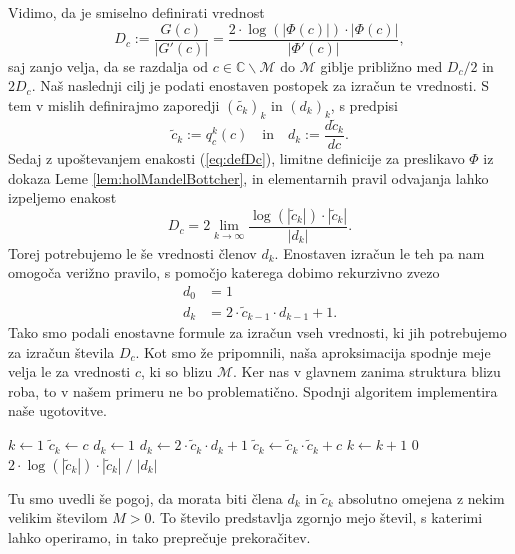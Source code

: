 \documentclass[12pt,a4paper]{amsart}
\theoremstyle{definition} %
\theoremstyle{plain} %
\newcommand{\CC}{\mathbb C}
\newcommand{\M}{\mathscr M} %
\newcommand{\algAnd}{\;\textbf{and}\;}
\begin{document}
Vidimo, da je smiselno definirati vrednost 
\begin{equation}\label{eq:defDc}
D_c := \frac{G(c)}{|G'(c)|} =  \frac{2 \cdot \log\left(|\Phi(c)|\right) \cdot |\Phi(c)|}{|\Phi'(c)|},
\end{equation}
saj zanjo velja, da se razdalja od $c \in \CC \smallsetminus \M$ do $\M$ giblje približno med $D_c/2$ in $2D_c$.
Naš naslednji cilj je podati enostaven postopek za izračun te vrednosti.
S tem v mislih definirajmo zaporedji $(\tilde{c_k})_k$ in $(d_k)_k$, s predpisi
$$\tilde{c}_k := q_c^k(c) \quad \text{in} \quad d_k := \frac{d\tilde{c}_k}{dc}.$$
Sedaj z upoštevanjem enakosti (\ref{eq:defDc}), limitne definicije za preslikavo $\Phi$ iz dokaza Leme \ref{lem:holMandelBottcher},
in elementarnih pravil odvajanja lahko izpeljemo enakost
$$
D_c = 2 \lim_{k\to\infty} \frac{\log(|\tilde{c}_k|) \cdot |\tilde{c}_k|}{|d_k|}.
$$
Torej potrebujemo le še vrednosti členov $d_k$.
Enostaven izračun le teh pa nam omogoča verižno pravilo, s pomočjo katerega dobimo rekurzivno zvezo
\begin{align*}
d_0 &= 1 \\
d_k &= 2\cdot \tilde{c}_{k-1} \cdot d_{k-1} + 1.
\end{align*}
Tako smo podali enostavne formule za izračun vseh vrednosti, ki jih potrebujemo za izračun števila $D_c$.
Kot smo že pripomnili, naša aproksimacija spodnje meje velja le za vrednosti $c$, ki so blizu $\M$.
Ker nas v glavnem zanima struktura blizu roba, to v našem primeru ne bo problematično.
Spodnji algoritem implementira naše ugotovitve.
\begin{small}
\begin{algorithmic}
	\State $k \gets 1$
	\State $\tilde{c}_k \gets c$
	\State $d_k \gets 1$
	\While{$k \leq K \algAnd \max\{|\tilde{c}_k|, |d_k|\} \leq M$}
		\State $d_k \gets 2 \cdot \tilde{c}_k \cdot d_k + 1$
		\State $\tilde{c}_k \gets \tilde{c}_k \cdot \tilde{c}_k + c$
		\State $k \gets k + 1$
	\EndWhile
		\Return $0$
	\Else \
		\Return $2 \cdot \log(|\tilde{c}_k|) \cdot |\tilde{c}_k| \;/\; |d_k|$
	\EndIf
\EndFunction
\end{algorithmic}
\end{small}
Tu smo uvedli še pogoj, da morata biti člena $d_k$ in $\tilde{c}_k$ absolutno omejena z nekim velikim številom $M>0$.
To število predstavlja zgornjo mejo števil, s katerimi lahko operiramo, in tako preprečuje prekoračitev.
\end{document}
